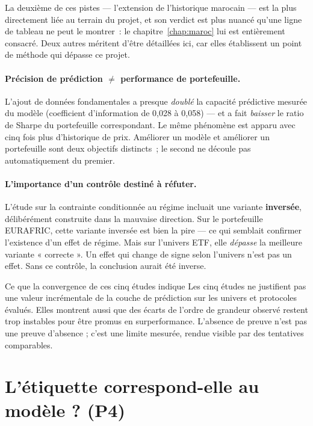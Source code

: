 La deuxième de ces pistes — l'extension de l'historique marocain — est la plus
directement liée au terrain du projet, et son verdict est plus nuancé qu'une
ligne de tableau ne peut le montrer~: le chapitre~\ref{chap:maroc} lui est
entièrement consacré. Deux autres méritent d'être détaillées ici, car elles
établissent un point de méthode qui dépasse ce projet.

\paragraph{Précision de prédiction $\neq$ performance de portefeuille.} L'ajout
de données fondamentales a presque \emph{doublé} la capacité prédictive mesurée
du modèle (coefficient d'information de 0,028 à 0,058) — et a fait \emph{baisser}
le ratio de Sharpe du portefeuille correspondant. Le même phénomène est apparu
avec cinq fois plus d'historique de prix. Améliorer un modèle et améliorer un
portefeuille sont deux objectifs distincts~; le second ne découle pas
automatiquement du premier.

\paragraph{L'importance d'un contrôle destiné à réfuter.} L'étude sur la
contrainte conditionnée au régime incluait une variante \textbf{inversée},
délibérément construite dans la mauvaise direction. Sur le portefeuille EURAFRIC,
cette variante inversée est bien la pire — ce qui semblait confirmer l'existence
d'un effet de régime. Mais sur l'univers ETF, elle \emph{dépasse} la meilleure
variante « correcte ». Un effet qui change de signe selon l'univers n'est pas un
effet. Sans ce contrôle, la conclusion aurait été inverse.

\begin{resultatbox}{Ce que la convergence de ces cinq études indique}
Les cinq études ne justifient pas une valeur incrémentale de la couche de
prédiction sur les univers et protocoles évalués. Elles montrent aussi que des
écarts de l'ordre de grandeur observé restent trop instables pour être promus en
surperformance. L'absence de preuve n'est pas une preuve d'absence ; c'est une
limite mesurée, rendue visible par des tentatives comparables.
\end{resultatbox}

\section{L'étiquette correspond-elle au modèle ? (P4)}

